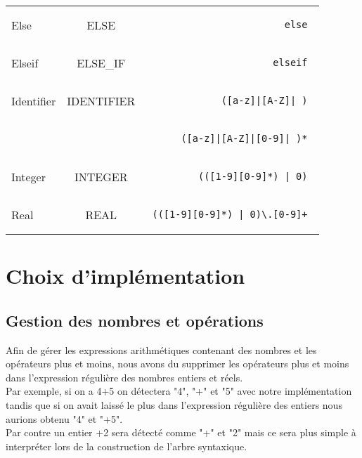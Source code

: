 \documentclass[a4paper,10pt]{article}
\begin{document}
\begin{tabular}{|l|c|r|}
Else & ELSE & \begin{minipage}{2in} \begin{verbatim} else \end{verbatim} \end{minipage} \\
Elseif & ELSE\_IF & \begin{minipage}{2in} \begin{verbatim} elseif \end{verbatim} \end{minipage} \\
Identifier & IDENTIFIER & \begin{minipage}{2in} \begin{verbatim} ([a-z]|[A-Z]|_) \end{verbatim} \end{minipage} \\
 &  & \begin{minipage}{2in} \begin{verbatim} ([a-z]|[A-Z]|[0-9]|_)* \end{verbatim} \end{minipage} \\
Integer & INTEGER & \begin{minipage}{2in} \begin{verbatim} (([1-9][0-9]*) | 0) \end{verbatim} \end{minipage} \\
Real & REAL & \begin{minipage}{2in} \begin{verbatim} (([1-9][0-9]*) | 0)\.[0-9]+ \end{verbatim} \end{minipage} \\
  \hline
\end{tabular}

\section{Choix d'implémentation}

\subsection{Gestion des nombres et opérations}

Afin de gérer les expressions arithmétiques contenant des nombres et les opérateurs plus et moins, nous avons du supprimer les opérateurs plus et moins dans l'expression régulière des nombres entiers et réels.\\
Par exemple, si on a 4+5 on détectera "4", "+" et "5" avec notre implémentation tandis que si on avait laissé le plus dans l'expression régulière des entiers nous aurions obtenu "4" et "+5".\\
Par contre un entier +2 sera détecté comme "+" et "2" mais ce sera plus simple à interpréter lors de la construction de l'arbre syntaxique.
\end{document}
